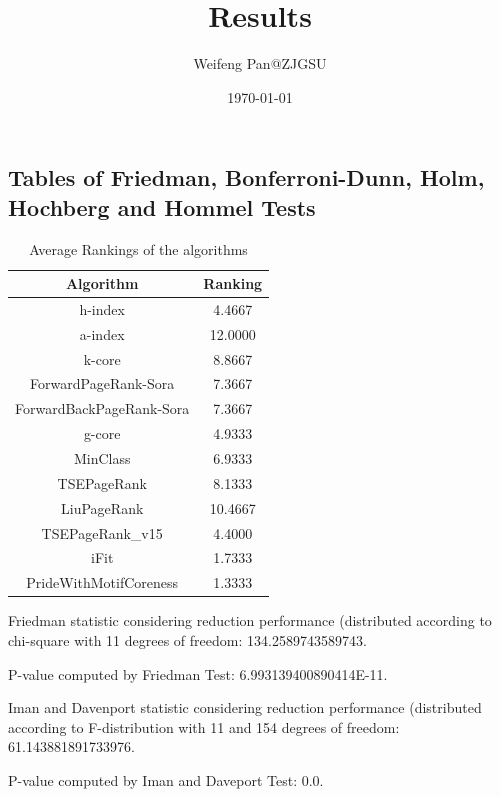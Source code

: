 \documentclass[a4paper,10pt]{article}
\title{Results}
\author{Weifeng Pan@ZJGSU}
\date{\today}
\begin{document}
\begin{landscape}
\oddsidemargin 0in \topmargin 0in\maketitle
\section{Tables of Friedman, Bonferroni-Dunn, Holm, Hochberg and Hommel Tests}
\begin{table}[!htp]
\centering
\caption{Average Rankings of the algorithms
}\begin{tabular}{c|c}
Algorithm&Ranking\\
\hline
h-index&4.4667\\
a-index&12.0000\\
k-core&8.8667\\
ForwardPageRank-Sora&7.3667\\
ForwardBackPageRank-Sora&7.3667\\
g-core&4.9333\\
MinClass&6.9333\\
TSEPageRank&8.1333\\
LiuPageRank&10.4667\\
TSEPageRank_v15&4.4000\\
iFit&1.7333\\
PrideWithMotifCoreness&1.3333\\
\end{tabular}
\end{table}


Friedman statistic considering reduction performance (distributed according to chi-square with 11 degrees of freedom: 134.2589743589743.


P-value computed by Friedman Test: 6.993139400890414E-11.\newline

Iman and Davenport statistic considering reduction performance (distributed according to F-distribution with 11 and 154 degrees of freedom: 61.143881891733976.


P-value computed by Iman and Daveport Test: 0.0.\newline


\end{landscape}
\end{document}
